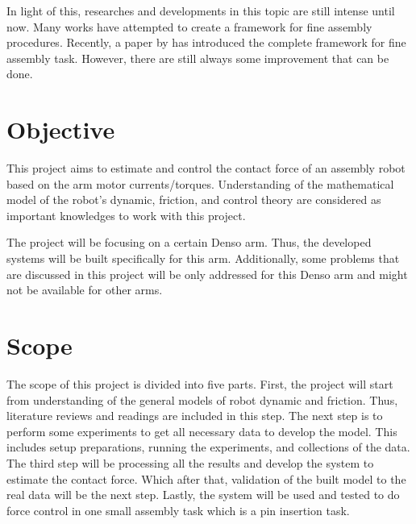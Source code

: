 In light of this, researches and developments in this topic are still intense until now. Many works have attempted to create a framework for fine assembly procedures. Recently, a paper by \cite{cuong15} has introduced the complete framework for fine assembly task. However, there are still always some improvement that can be done.

\section{Objective}


This project aims to estimate and control the contact force of an assembly robot based on the arm motor currents/torques. Understanding of the mathematical model of the robot’s dynamic, friction, and control theory are considered as important knowledges to work with this project.

The project will be focusing on a certain Denso arm. Thus, the developed systems will be built specifically for this arm. Additionally, some problems that are discussed in this project will be only addressed for this Denso arm and might not be available for other arms.


\section{Scope}


The scope of this project is divided into five parts. First, the project will start from understanding of the general models of robot dynamic and friction. Thus, literature reviews and readings are included in this step. The next step is to perform some experiments to get all necessary data to develop the model. This includes setup preparations, running the experiments, and collections of the data. The third step will be processing all the results and develop the system to estimate the contact force. Which after that, validation of the built model to the real data will be the next step. Lastly, the system will be used and tested to do force control in one small assembly task which is a pin insertion task.

